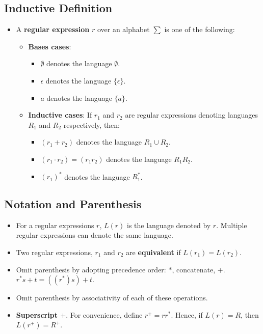 \documentclass[12pt]{article}
\begin{document}
\subsection{Inductive Definition}
\begin{itemize}
    \item A \textbf{regular expression} $r$ over an alphabet $\sum$ is one of the following:
    \begin{itemize}
        \item \textbf{Bases cases}:
        \begin{itemize}
            \item $\emptyset$ denotes the language $\emptyset$.
            \item $\epsilon$ denotes the language $\{\epsilon\}$.
            \item $a$ denotes the language $\{a\}$.
        \end{itemize}
        \item \textbf{Inductive cases}: If $r_1$ and $r_2$ are regular expressions denoting languages $R_1$ and $R_2$ respectively, then:
        \begin{itemize}
            \item $(r_1 + r_2)$ denotes the language $R_1 \cup R_2$.
            \item $(r_1 \cdot r_2) = (r_1r_2)$ denotes the language $R_1R_2$.
            \item $(r_1)^{\ast}$ denotes the language $R_1^{\ast}$.
        \end{itemize}
    \end{itemize}
\end{itemize}

\subsection{Notation and Parenthesis}
\begin{itemize}
    \item For a regular expressions $r$, $L(r)$ is the language denoted by $r$. Multiple regular expressions can denote the same language.
    \item Two regular expressions, $r_1$ and $r_2$ are \textbf{equivalent} if $L(r_1) = L(r_2)$.
    \item Omit parenthesis by adopting precedence order: $\ast$, concatenate, $+$. $r^{\ast} s + t = ((r^{\ast})s)+t$.
    \item Omit parenthesis by associativity of each of these operations.
    \item \textbf{Superscript $+$}. For convenience, define $r^+ = rr^{\ast}$. Hence, if $L(r) = R$, then $L(r^+) = R^+$.
\end{itemize}
\end{document}
